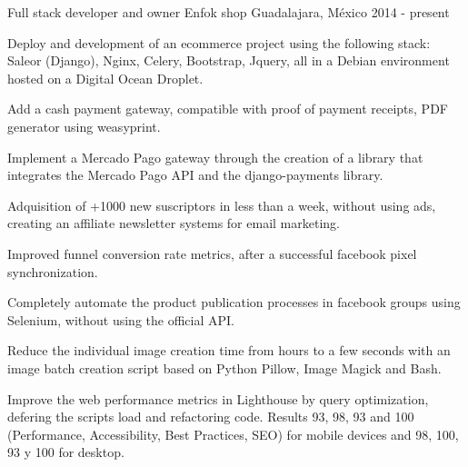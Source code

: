

\begin{cventries}

  \cventry
    {Full stack developer and owner}
    {Enfok shop}
    {Guadalajara, México}
    {2014 - present}
    {
      \begin{cvitems}
        \item {Deploy and development of an ecommerce project using the following stack: Saleor (Django), Nginx, Celery, Bootstrap, Jquery, all in a Debian environment hosted on a Digital Ocean Droplet.}
        \item {Add a cash payment gateway, compatible with proof of payment receipts, PDF generator using weasyprint.}
        \item {Implement a Mercado Pago gateway through the creation of a library that integrates the Mercado Pago API and the django-payments library.}
        \item {Adquisition of +1000 new suscriptors in less than a week, without using ads, creating an affiliate newsletter systems for email marketing.}
        \item {Improved funnel conversion rate metrics, after a successful facebook pixel synchronization.}
        \item {Completely automate the product publication processes in facebook groups using Selenium, without using the official API.}
        \item {Reduce the individual image creation time from hours to a few seconds with an image batch creation script based on Python Pillow, Image Magick and Bash.}
        \item {Improve the web performance metrics in Lighthouse by query optimization, defering the scripts load and refactoring code. Results 93, 98, 93 and 100 (Performance, Accessibility, Best Practices, SEO) for mobile devices and 98, 100, 93 y 100 for desktop.}
      \end{cvitems}
    }


\end{cventries}
